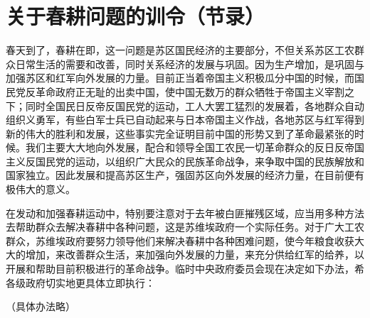 \section[关于春耕问题的训令（节录）（一九三二年二月八日）]{关于春耕问题的训令（节录）}


春天到了，春耕在即，这一问题是苏区国民经济的主要部分，不但关系苏区工农群众日常生活的需要和改善，同时关系经济的发展与巩固。因为生产增加，是巩固与加强苏区和红军向外发展的力量。目前正当着帝国主义积极瓜分中国的时候，而国民党反革命政府正无耻的出卖中国，使中国无数万的群众牺牲于帝国主义宰割之下；同时全国民日反帝反国民党的运动，工人大罢工猛烈的发展着，各地群众自动组织义勇军，有些白军士兵已自动起来与日本帝国主义作战，各地苏区与红军得到新的伟大的胜利和发展，这些事实完全证明目前中国的形势又到了革命最紧张的时候。我们主要大大地向外发展，配合和领导全国工农民一切革命群众的反日反帝国主义反国民党的运动，以组织广大民众的民族革命战争，来争取中国的民族解放和国家独立。因此发展和提高苏区生产，强固苏区向外发展的经济力量，在目前便有极伟大的意义。

在发动和加强春耕运动中，特别要注意对于去年被白匪摧残区域，应当用多种方法去帮助群众去解决春耕中各种问题，这是苏维埃政府一个实际任务。对于广大工农群众，苏维埃政府要努力领导他们来解决春耕中各种困难问题，使今年粮食收获大大的增加，来改善群众生活，来加强向外发展的力量，来充分供给红军的给养，以开展和帮助目前积极进行的革命战争。临时中央政府委员会现在决定如下办法，希各级政府切实地更具体立即执行：

（具体办法略）

